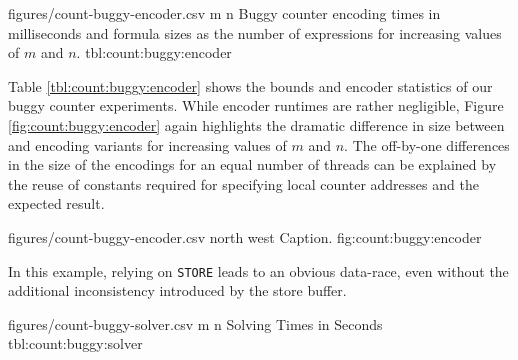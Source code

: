
\newcommand{\CountRowHeader}[1]{\StrSubstitute{#1}{ }{\hfill}}


\EncoderStatsTable
  {figures/count-buggy-encoder.csv}
  {m n}
  {\CountRowHeader}
  {Buggy counter encoding times in milliseconds and formula sizes as the number of expressions for increasing values of $m$ and $n$.}
  {tbl:count:buggy:encoder}

Table \ref{tbl:count:buggy:encoder} shows the bounds and encoder statistics of our buggy counter experiments.
While encoder runtimes are rather negligible, Figure \ref{fig:count:buggy:encoder} again highlights the dramatic difference in size between {\BTOR} and {\SMTLIB} encoding variants for increasing values of $m$ and $n$. %
The off-by-one differences in the size of the {\BTOR} encodings for an equal number of threads can be explained by the reuse of constants required for specifying local counter addresses and the expected result.

\EncoderStatsGraph
  {figures/count-buggy-encoder.csv}
  {north west}
  {Caption.}
  {fig:count:buggy:encoder}

\newpage
{}

In this example, relying on \lstinline[style=asm]{STORE} leads to an obvious data-race, even without the additional inconsistency introduced by the store buffer.

\SolverStatsTable
  {figures/count-buggy-solver.csv}
  {m n}
  {\CountRowHeader}
  {Solving Times in Seconds}
  {tbl:count:buggy:solver}

